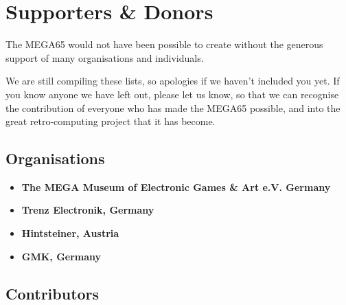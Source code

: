 \chapter{Supporters \& Donors}

The MEGA65 would not have been possible to create without the generous support
of many organisations and individuals.

We are still compiling these lists, so apologies if we haven't included you yet.  If you
know anyone we have left out, please let us know, so that we can recognise the contribution
of everyone who has made the MEGA65 possible, and into the great retro-computing project
that it has become.

\section{Organisations}

\begin{itemize}
\item {\bf The MEGA Museum of Electronic Games \& Art e.V. Germany} 
\item {\bf Trenz Electronik, Germany} 
\item {\bf Hintsteiner, Austria} 
\item {\bf GMK, Germany} 
\end{itemize}

\section{Contributors}


